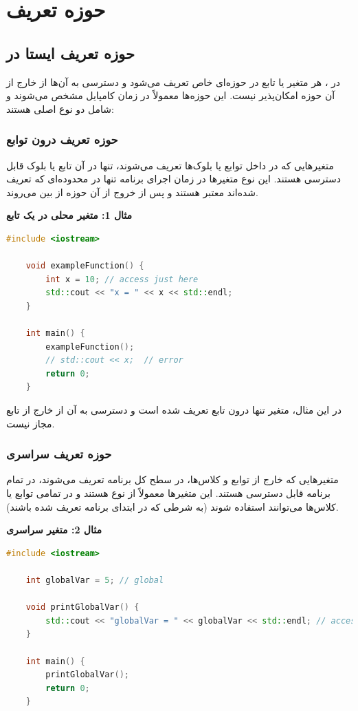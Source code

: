 \documentclass[12pt, a4paper]{report}
\begin{document}
\section{حوزه تعریف }
\subsection{حوزه تعریف ایستا  در }
در ، هر متغیر یا تابع در حوزه‌ای خاص تعریف می‌شود و دسترسی به آن‌ها از خارج از آن حوزه امکان‌پذیر نیست. این حوزه‌ها معمولاً در زمان کامپایل مشخص می‌شوند و شامل دو نوع اصلی هستند:

\subsubsection{حوزه تعریف درون توابع }
متغیرهایی که در داخل توابع یا بلوک‌ها تعریف می‌شوند، تنها در آن تابع یا بلوک قابل دسترسی هستند. این نوع متغیرها در زمان اجرای برنامه تنها در محدوده‌ای که تعریف شده‌اند معتبر هستند و پس از خروج از آن حوزه از بین می‌روند.

\textbf{مثال 1: متغیر محلی در یک تابع}
\LTR
\begin{lstlisting}[language=C++,breaklines=true]
	#include <iostream>
	
	void exampleFunction() {
		int x = 10; // access just here
		std::cout << "x = " << x << std::endl;
	}
	
	int main() {
		exampleFunction();
		// std::cout << x;  // error
		return 0;
	}
\end{lstlisting}
\RTL

در این مثال، متغیر  تنها درون تابع  تعریف شده است و دسترسی به آن از خارج از تابع مجاز نیست.

\subsubsection{حوزه تعریف سراسری }
متغیرهایی که خارج از توابع و کلاس‌ها، در سطح کل برنامه تعریف می‌شوند، در تمام برنامه قابل دسترسی هستند. این متغیرها معمولاً از نوع  هستند و در تمامی توابع یا کلاس‌ها می‌توانند استفاده شوند (به شرطی که در ابتدای برنامه تعریف شده باشند).

\textbf{مثال 2: متغیر سراسری}
\LTR
\begin{lstlisting}[language=C++, breaklines=true]
	#include <iostream>
	
	int globalVar = 5; // global
	
	void printGlobalVar() {
		std::cout << "globalVar = " << globalVar << std::endl; // access to global
	}
	
	int main() {
		printGlobalVar();
		return 0;
	}
\end{lstlisting}
\RTL
\end{document}
